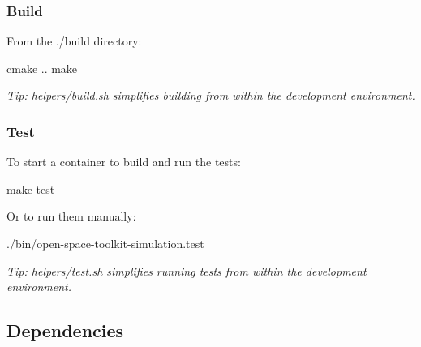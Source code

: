 \subsubsection*{Build}

From the {\ttfamily ./build} directory\+:


\begin{DoxyCode}
cmake ..
make
\end{DoxyCode}


{\itshape Tip\+: {\ttfamily helpers/build.\+sh} simplifies building from within the development environment.}

\subsubsection*{Test}

To start a container to build and run the tests\+:


\begin{DoxyCode}
make test
\end{DoxyCode}


Or to run them manually\+:


\begin{DoxyCode}
./bin/open-space-toolkit-simulation.test
\end{DoxyCode}


{\itshape Tip\+: {\ttfamily helpers/test.\+sh} simplifies running tests from within the development environment.}

\subsection*{Dependencies}

